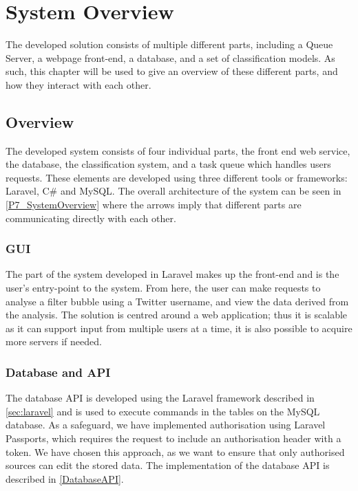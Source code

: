 \chapter{System Overview}\label{ch:sysview}
The developed solution consists of multiple different parts, including a Queue
Server, a webpage front-end, a database, and a set of classification models. As
such, this chapter will be used to give an overview of these different parts,
and how they interact with each other.

\section{Overview}
The developed system consists of four individual parts, the front end web
service, the database, the classification system, and a task queue which handles
users requests. These elements are developed using three different tools or
frameworks: Laravel, C\# and MySQL. The overall architecture of the system can
be seen in \autoref{P7_SystemOverview} where the arrows imply that different
parts are communicating directly with each other.
 

\subsection{GUI} %
The part of the system developed in Laravel makes up the front-end and is the
user's entry-point to the system. From here, the user can make requests to
analyse a filter bubble using a Twitter username, and view the data derived from
the analysis. The solution is centred around a web application; thus it is
scalable as it can support input from multiple users at a time, it is also
possible to acquire more servers if needed.

\subsection{Database and API}
The database \ac{API} is developed using the Laravel framework described in
\autoref{sec:laravel} and is used to execute commands in the tables on the MySQL
database. As a safeguard, we have implemented authorisation using Laravel
Passports, which requires the request to include an authorisation header with a
 token. We have chosen this approach, as we want to ensure that
only authorised sources can edit the stored data. The implementation of the
database \ac{API} is described in \autoref{DatabaseAPI}.

